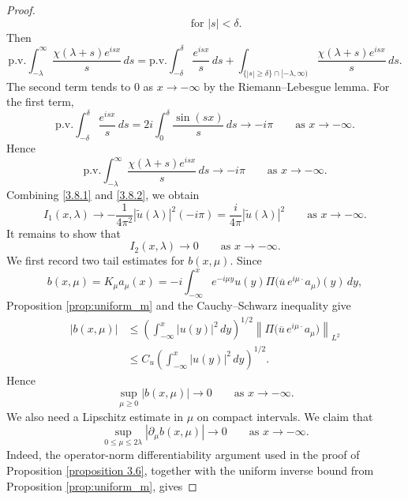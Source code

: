 \documentclass[10pt]{article}
\numberwithin{equation}{section}
\numberwithin{theorem}{section}
\begin{document}
\begin{proof}
\[\qquad\text{for } |s|<\delta .
\]
Then
\[
\mathrm{p.v.}\int_{-\lambda}^{\infty}
\frac{\chi(\lambda+s)e^{isx}}{s}\,ds
=
\mathrm{p.v.}\int_{-\delta}^{\delta}
\frac{e^{isx}}{s}\,ds
+
\int_{\{|s|\ge\delta\}\cap[-\lambda,\infty)}
\frac{\chi(\lambda+s)e^{isx}}{s}\,ds .
\]
The second term tends to \(0\) as \(x\to-\infty\) by the Riemann--Lebesgue lemma. For the
first term,
\[
\mathrm{p.v.}\int_{-\delta}^{\delta}
\frac{e^{isx}}{s}\,ds
=
2i\int_0^\delta\frac{\sin(sx)}{s}\,ds
\longrightarrow -i\pi
\qquad\text{as }x\to-\infty .
\]
Hence
\begin{equation}
\label{3.8.2}
\mathrm{p.v.}\int_{-\lambda}^{\infty}
\frac{\chi(\lambda+s)e^{isx}}{s}\,ds
\longrightarrow -i\pi
\qquad\text{as }x\to-\infty .
\end{equation}
Combining \eqref{3.8.1} and \eqref{3.8.2}, we obtain
\begin{equation}
\label{3.8.3}
I_1(x,\lambda)
\longrightarrow
-\frac{1}{4\pi^2}|\widetilde u(\lambda)|^2(-i\pi)
=
\frac{i}{4\pi}|\widetilde u(\lambda)|^2
\qquad\text{as }x\to-\infty .
\end{equation}
It remains to show that
\begin{equation}
\label{3.8.4}
I_2(x,\lambda)\to0
\qquad\text{as }x\to-\infty .
\end{equation}
We first record two tail estimates for \(b(x,\mu)\). Since
\[
b(x,\mu)=K_\mu a_\mu(x)
=
-i\int_{-\infty}^x
e^{-i\mu y}u(y)
\Pi\bigl(\overline u\,e^{i\mu\cdot}a_\mu\bigr)(y)\,dy ,
\]
Proposition \ref{prop:uniform_m} and the Cauchy--Schwarz inequality give
\[
\begin{aligned}
|b(x,\mu)|
&\le
\left(\int_{-\infty}^x |u(y)|^2\,dy\right)^{1/2}
\left\|\Pi\bigl(\overline u\,e^{i\mu\cdot}a_\mu\bigr)\right\|_{L^2} \\
&\le
C_u
\left(\int_{-\infty}^x |u(y)|^2\,dy\right)^{1/2}.
\end{aligned}
\]
Hence
\begin{equation}
\label{3.8.5}
\sup_{\mu\ge0}|b(x,\mu)|\to0
\qquad\text{as }x\to-\infty .
\end{equation}
We also need a Lipschitz estimate in \(\mu\) on compact intervals. We claim that
\begin{equation}
\label{3.8.6}
\sup_{0\le\mu\le 2\lambda}
|\partial_\mu b(x,\mu)|
\longrightarrow0
\qquad\text{as }x\to-\infty .
\end{equation}
Indeed, the operator-norm differentiability argument used in the proof of Proposition
\ref{proposition 3.6}, together with the uniform inverse bound from Proposition
\ref{prop:uniform_m}, gives

\end{proof}
\end{document}
